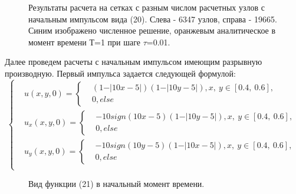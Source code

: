 \documentclass[14pt]{article}
\begin{document}
\newpage
\begin{figure}[!h!]
\caption{Результаты расчета на сетках с разным числом расчетных узлов с начальным импульсом вида (20). Слева - 6347 узлов, справа - 19665. Синим изображено численное решение, оранжевым аналитическое в момент времени Т=1 при шаге $\tau$=0.01.}
\end{figure}
Далее проведем расчеты с начальным импульсом имеющим разрывную производную. Первый импульса задается следующей формулой:
\begin{equation}
\left\lbrace
\begin{aligned}
&u(x,y,0) = \left\lbrace \begin{aligned}
&(1 - \vert 10x - 5 \vert)(1- \vert 10y - 5\vert), x,\:y \in [0.4,\:0.6],\\
&0, else
\end{aligned}
\right . \\
&u_x(x,y,0) = \left\lbrace \begin{aligned}
&-10 sign(10x-5)(1- \vert 10y - 5\vert), x,\:y \in [0.4,\:0.6],\\
&0, else
\end{aligned}
\right . \\
&u_y(x,y,0) =  \left\lbrace \begin{aligned}
&-10 sign(10y-5)(1- \vert 10x - 5\vert), x,\:y \in [0.4,\:0.6],\\
&0, else
\end{aligned}
\right . \\
\end{aligned}
\right .
\end{equation}
\begin{figure}[!h!]
\caption{Вид функции (21) в начальный момент времени.}
\end{figure}
\end{document}
